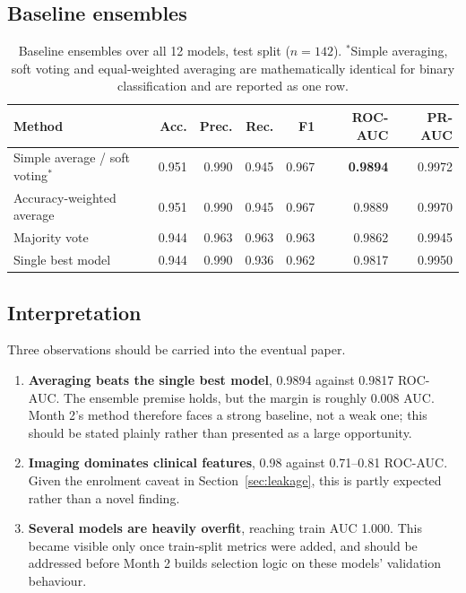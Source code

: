 \documentclass[11pt,a4paper]{article}
\begin{document}
\subsection{Baseline ensembles}

\begin{table}[h]
\centering
\begin{tabular}{@{}l r r r r r r@{}}
\toprule
\textbf{Method} & \textbf{Acc.} & \textbf{Prec.} & \textbf{Rec.} & \textbf{F1} & \textbf{ROC-AUC} & \textbf{PR-AUC} \\
\midrule
Simple average / soft voting$^{\ast}$ & 0.951 & 0.990 & 0.945 & 0.967 & \textbf{0.9894} & 0.9972 \\
Accuracy-weighted average             & 0.951 & 0.990 & 0.945 & 0.967 & 0.9889 & 0.9970 \\
Majority vote                         & 0.944 & 0.963 & 0.963 & 0.963 & 0.9862 & 0.9945 \\
Single best model                     & 0.944 & 0.990 & 0.936 & 0.962 & 0.9817 & 0.9950 \\
\bottomrule
\end{tabular}
\caption{Baseline ensembles over all 12 models, test split ($n=142$).
$^{\ast}$Simple averaging, soft voting and equal-weighted averaging are
mathematically identical for binary classification and are reported as one row.}
\label{tab:ensembles}
\end{table}

\subsection{Interpretation}

Three observations should be carried into the eventual paper.

\begin{enumerate}
  \item \textbf{Averaging beats the single best model}, 0.9894 against 0.9817
        ROC-AUC. The ensemble premise holds, but the margin is roughly 0.008
        AUC. Month 2's method therefore faces a strong baseline, not a weak one;
        this should be stated plainly rather than presented as a large
        opportunity.
  \item \textbf{Imaging dominates clinical features}, 0.98 against 0.71--0.81
        ROC-AUC. Given the enrolment caveat in Section~\ref{sec:leakage}, this
        is partly expected rather than a novel finding.
  \item \textbf{Several models are heavily overfit}, reaching train AUC 1.000.
        This became visible only once train-split metrics were added, and should
        be addressed before Month 2 builds selection logic on these models'
        validation behaviour.
\end{enumerate}
\end{document}
